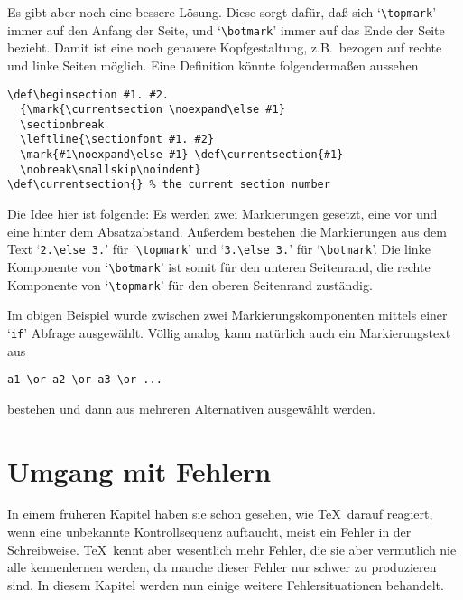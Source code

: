 Es gibt aber noch eine bessere L\"osung. Diese sorgt daf\"ur, da\ss{} sich
`\verb|\topmark|' immer auf den Anfang der Seite, und
`\verb|\botmark|' immer auf das Ende der 
Seite bezieht. Damit ist eine
noch genauere 
Kopfgestaltung, z.B.\ bezogen auf rechte und linke
Seiten m\"oglich. Eine Definition k\"onnte folgenderma\ss{}en aussehen
\begin{verbatim}
\def\beginsection #1. #2.
  {\mark{\currentsection \noexpand\else #1}
  \sectionbreak
  \leftline{\sectionfont #1. #2}
  \mark{#1\noexpand\else #1} \def\currentsection{#1}
  \nobreak\smallskip\noindent}
\def\currentsection{} % the current section number
\end{verbatim}
Die Idee hier ist folgende: Es werden zwei Markierungen gesetzt, eine
vor und eine hinter dem 
Absatzabstand. Au\ss{}erdem bestehen die
Markierungen aus dem Text `\verb|2.\else 3.|' f\"ur
`\verb|\topmark|'
und `\verb|3.\else 3.|' f\"ur 
`\verb|\botmark|'. Die linke Komponente
von `\verb|\botmark|' ist somit f\"ur den unteren
Seitenrand, die rechte
Komponente von `\verb|\topmark|' f\"ur den oberen 
Seitenrand zust\"andig.

Im obigen Beispiel wurde zwischen zwei Markierungskomponenten mittels
einer `\verb|if|' Abfrage ausgew\"ahlt. V\"ollig analog kann nat\"urlich
auch ein Markierungstext aus
\begin{verbatim}
a1 \or a2 \or a3 \or ...
\end{verbatim}
bestehen und dann aus mehreren Alternativen ausgew\"ahlt werden.
\chapter{Umgang mit Fehlern}
In einem fr\"uheren Kapitel haben sie schon gesehen, wie \TeX\ darauf
reagiert, wenn eine unbekannte 
Kontrollsequenz auftaucht, meist ein
Fehler in der Schreibweise. \TeX\ kennt aber wesentlich mehr Fehler,
die sie aber vermutlich nie alle kennenlernen werden, da manche dieser
Fehler nur schwer zu produzieren sind. In diesem Kapitel werden nun
einige weitere Fehlersituationen behandelt.
